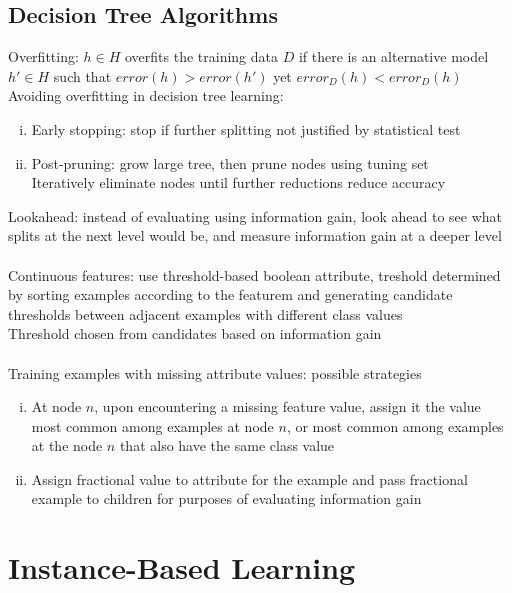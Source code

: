 \documentclass{article}
\begin{document}
		\subsection{Decision Tree Algorithms}
			Overfitting: $h \in H$ overfits the training data $D$ if there is an alternative model $h' \in H$ such that $error(h) > error(h')$ yet $error_D(h) < error_D(h)$ \\
			Avoiding overfitting in decision tree learning:
			\begin{enumerate}[(i)]
				\item Early stopping: stop if further splitting not justified by statistical test
				\item Post-pruning: grow large tree, then prune nodes using tuning set \\
				Iteratively eliminate nodes until further reductions reduce accuracy
				\end{enumerate}
			Lookahead: instead of evaluating using information gain, look ahead to see what splits at the next level would be, and measure information gain at a deeper level \\
			\\
			Continuous features: use threshold-based boolean attribute, treshold determined by sorting examples according to the featurem and generating candidate thresholds between adjacent examples with different class values \\
			Threshold chosen from candidates based on information gain \\
			\\
			Training examples with missing attribute values: possible strategies
			\begin{enumerate}[(i)]
				\item At node $n$, upon encountering a missing feature value, assign it the value most common among examples at node $n$, or most common among examples at the node $n$ that also have the same class value
				\item Assign fractional value to attribute for the example and pass fractional example to children for purposes of evaluating information gain
				\end{enumerate}
		\clearpage

	\section{Instance-Based Learning}
\end{document}
